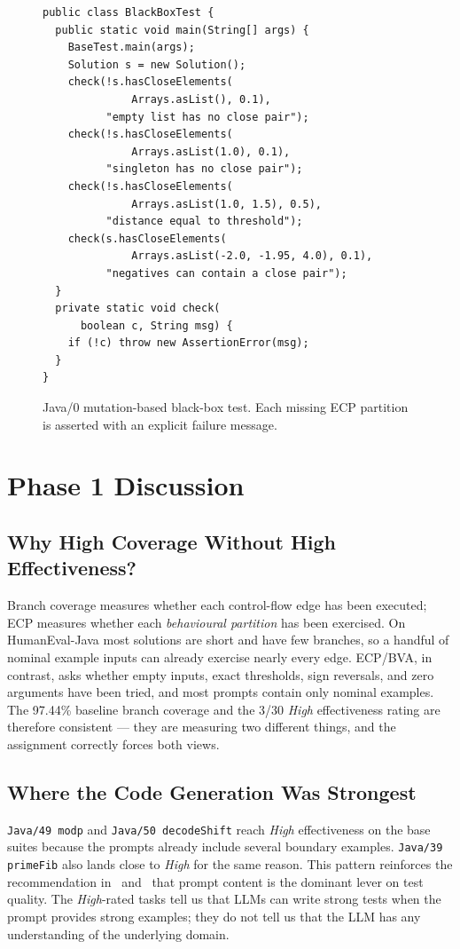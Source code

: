 \documentclass[journal]{IEEEtran}
\begin{document}
\begin{figure}[!t]
\begin{lstlisting}
public class BlackBoxTest {
  public static void main(String[] args) {
    BaseTest.main(args);
    Solution s = new Solution();
    check(!s.hasCloseElements(
              Arrays.asList(), 0.1),
          "empty list has no close pair");
    check(!s.hasCloseElements(
              Arrays.asList(1.0), 0.1),
          "singleton has no close pair");
    check(!s.hasCloseElements(
              Arrays.asList(1.0, 1.5), 0.5),
          "distance equal to threshold");
    check(s.hasCloseElements(
              Arrays.asList(-2.0, -1.95, 4.0), 0.1),
          "negatives can contain a close pair");
  }
  private static void check(
      boolean c, String msg) {
    if (!c) throw new AssertionError(msg);
  }
}
\end{lstlisting}
\caption{Java/0 mutation-based black-box test. Each missing
ECP partition is asserted with an explicit failure
message.}
\label{fig:j0bb}
\end{figure}

\section{Phase 1 Discussion}
\label{sec:discussion}

\subsection{Why High Coverage Without High Effectiveness?}
Branch coverage measures whether each control-flow edge has
been executed; ECP measures whether each \emph{behavioural
partition} has been exercised. On HumanEval-Java most
solutions are short and have few branches, so a handful of
nominal example inputs can already exercise nearly every
edge. ECP/BVA, in contrast, asks whether empty inputs, exact
thresholds, sign reversals, and zero arguments have been
tried, and most prompts contain only nominal examples. The
97.44\% baseline branch coverage and the 3/30 \emph{High}
effectiveness rating are therefore consistent --- they are
measuring two different things, and the assignment correctly
forces both views.

\subsection{Where the Code Generation Was Strongest}
\texttt{Java/49 modp} and \texttt{Java/50 decodeShift} reach
\emph{High} effectiveness on the base suites because the
prompts already include several boundary examples.
\texttt{Java/39 primeFib} also lands close to \emph{High} for
the same reason. This pattern reinforces the recommendation
in~\cite{wang2024hits} and~\cite{yuan2024chattester} that
prompt content is the dominant lever on test quality. The
\emph{High}-rated tasks tell us that LLMs can write strong
tests when the prompt provides strong examples; they do not
tell us that the LLM has any understanding of the underlying
domain.
\end{document}
